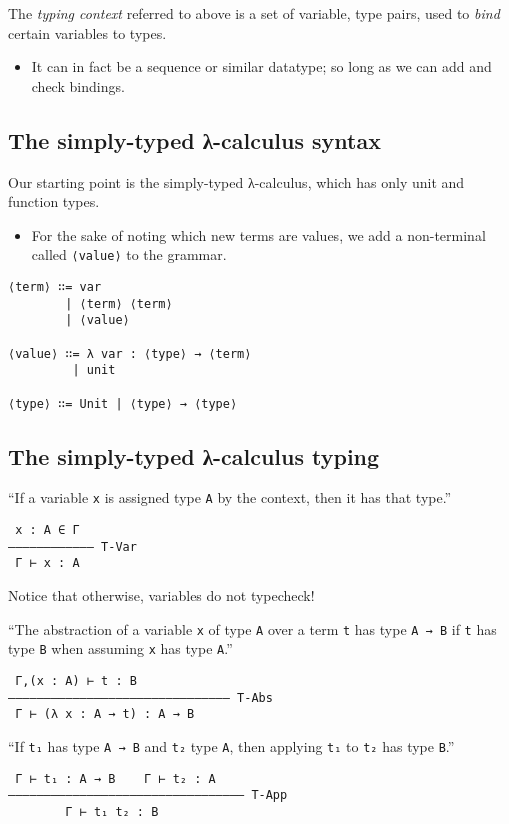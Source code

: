 \documentclass[11pt]{article}
\theoremstyle{definition}
\begin{document}
The \emph{typing context} referred to above is a set
of variable, type pairs, used to \emph{bind} certain variables to types.
\begin{itemize}
\item It can in fact be a sequence or similar datatype;
so long as we can add and check bindings.
\end{itemize}

\subsection{The simply-typed λ-calculus syntax}
\label{sec:org65135e2}

Our starting point is the simply-typed λ-calculus,
which has only unit and function types.
\begin{itemize}
\item For the sake of noting which new terms are values,
we add a non-terminal called \texttt{⟨value⟩} to the grammar.
\end{itemize}
\begin{verbatim}
⟨term⟩ ∷= var
        | ⟨term⟩ ⟨term⟩
        | ⟨value⟩
        
⟨value⟩ ∷= λ var : ⟨type⟩ → ⟨term⟩
         | unit
         
⟨type⟩ ∷= Unit | ⟨type⟩ → ⟨type⟩
\end{verbatim}

\subsection{The simply-typed λ-calculus typing}
\label{sec:org56403f3}

“If a variable \texttt{x} is assigned type \texttt{A} by the context,
then it has that type.”
\begin{verbatim}
 x : A ∈ Γ
–––––––––––– T-Var
 Γ ⊢ x : A
\end{verbatim}
Notice that otherwise, variables do not typecheck!

“The abstraction of a variable \texttt{x} of type \texttt{A} over a term \texttt{t} has
type \texttt{A → B} if \texttt{t} has type \texttt{B} when assuming \texttt{x} has type \texttt{A}.” 
\begin{verbatim}
 Γ,(x : A) ⊢ t : B
––––––––––––––––––––––––––––––– T-Abs
 Γ ⊢ (λ x : A → t) : A → B
\end{verbatim}

“If \texttt{t₁} has type \texttt{A → B} and \texttt{t₂} type \texttt{A}, then applying \texttt{t₁} to \texttt{t₂} has type \texttt{B}.”
\begin{verbatim}
 Γ ⊢ t₁ : A → B    Γ ⊢ t₂ : A
––––––––––––––––––––––––––––––––– T-App
        Γ ⊢ t₁ t₂ : B
\end{verbatim}
\end{document}

